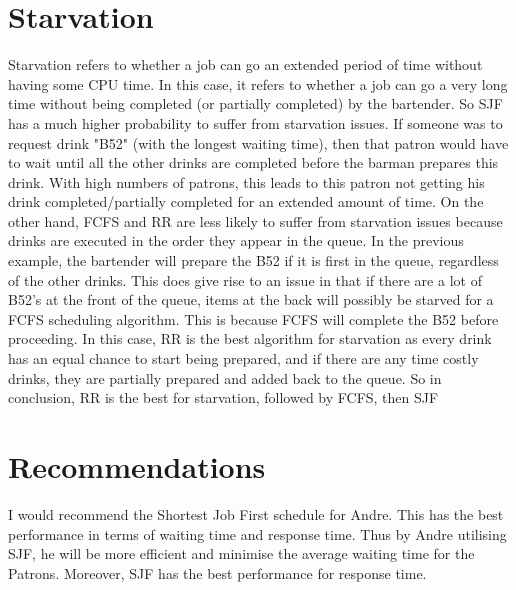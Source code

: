 \documentclass{assignment}
\begin{document}
\section{Starvation}
Starvation refers to whether a job can go an extended period of time without having some CPU time. In this case, it refers to whether a job can go a very long time without being completed (or partially completed) by the bartender. So SJF has a much higher probability to suffer from starvation issues. If someone was to request drink "B52" (with the longest waiting time), then that patron would have to wait until all the other drinks are completed before the barman prepares this drink. With high numbers of patrons, this leads to this patron not getting his drink completed/partially completed for an extended amount of time. On the other hand, FCFS and RR are less likely to suffer from starvation issues because drinks are executed in the order they appear in the queue. In the previous example, the bartender will prepare the B52 if it is first in the queue, regardless of the other drinks. This does give rise to an issue in that if there are a lot of B52's at the front of the queue, items at the back will possibly be starved for a FCFS scheduling algorithm. This is because FCFS will complete the B52 before proceeding. In this case, RR is the best algorithm for starvation as every drink has an equal chance to start being prepared, and if there are any time costly drinks, they are partially prepared and added back to the queue. So in conclusion, RR is the best for starvation, followed by FCFS, then SJF
\section{Recommendations}
I would recommend the Shortest Job First schedule for Andre. This has the best performance in terms of waiting time and response time. Thus by Andre utilising SJF, he will be more efficient and minimise the average waiting time for the Patrons. Moreover, SJF has the best performance for response time.
\end{document}
